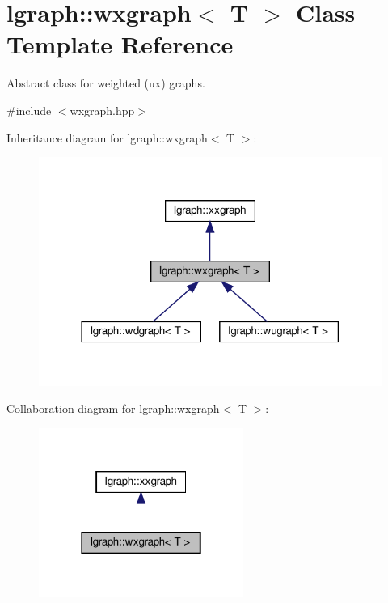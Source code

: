 \hypertarget{classlgraph_1_1wxgraph}{}\section{lgraph\+:\+:wxgraph$<$ T $>$ Class Template Reference}
\label{classlgraph_1_1wxgraph}


Abstract class for weighted (ux) graphs.  




{\ttfamily \#include $<$wxgraph.\+hpp$>$}



Inheritance diagram for lgraph\+:\+:wxgraph$<$ T $>$\+:\nopagebreak
\begin{figure}[H]
\begin{center}
\leavevmode
\includegraphics[width=318pt]{classlgraph_1_1wxgraph__inherit__graph}
\end{center}
\end{figure}


Collaboration diagram for lgraph\+:\+:wxgraph$<$ T $>$\+:\nopagebreak
\begin{figure}[H]
\begin{center}
\leavevmode
\includegraphics[width=190pt]{classlgraph_1_1wxgraph__coll__graph}
\end{center}
\end{figure}
